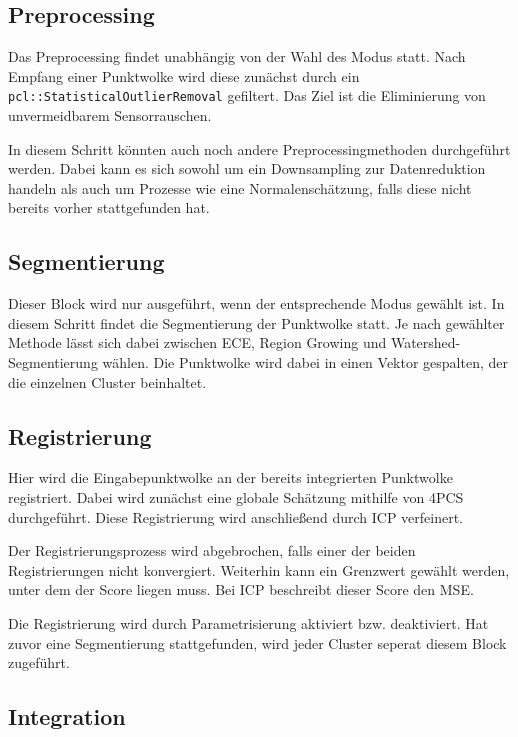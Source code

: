 \subsection{Preprocessing}
\label{subsec:pipeline-preprocessing}

Das Preprocessing findet unabhängig von der Wahl des Modus statt.
Nach Empfang einer Punktwolke wird diese zunächst durch ein \texttt{pcl::StatisticalOutlierRemoval} gefiltert.
Das Ziel ist die Eliminierung von unvermeidbarem Sensorrauschen.

In diesem Schritt könnten auch noch andere Preprocessingmethoden durchgeführt werden.
Dabei kann es sich sowohl um ein Downsampling zur Datenreduktion handeln als auch um Prozesse wie eine Normalenschätzung, falls diese nicht bereits vorher stattgefunden hat.

\subsection{Segmentierung}
\label{subsec:pipeline-segmentierung}

Dieser Block wird nur ausgeführt, wenn der entsprechende Modus gewählt ist.
In diesem Schritt findet die Segmentierung der Punktwolke statt.
Je nach gewählter Methode lässt sich dabei zwischen \ac{ECE}, Region Growing und Watershed-Segmentierung wählen.
Die Punktwolke wird dabei in einen Vektor gespalten, der die einzelnen Cluster beinhaltet.

\subsection{Registrierung}
\label{subsec:pipeline-registrierung}

Hier wird die Eingabepunktwolke an der bereits integrierten Punktwolke registriert.
Dabei wird zunächst eine globale Schätzung mithilfe von \ac{4PCS} durchgeführt.
Diese Registrierung wird anschließend durch \ac{ICP} verfeinert.

Der Registrierungsprozess wird abgebrochen, falls einer der beiden Registrierungen nicht konvergiert.
Weiterhin kann ein Grenzwert gewählt werden, unter dem der Score liegen muss.
Bei \ac{ICP} beschreibt dieser Score den \ac{MSE}.

Die Registrierung wird durch Parametrisierung aktiviert bzw. deaktiviert.
Hat zuvor eine Segmentierung stattgefunden, wird jeder Cluster seperat diesem Block zugeführt.

\subsection{Integration}
\label{subsec:pipeline-integration}

